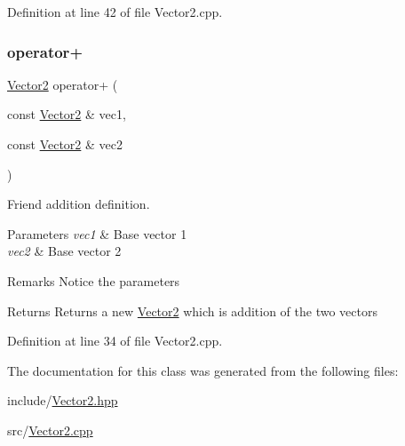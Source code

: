 Definition at line 42 of file Vector2.\+cpp.

\mbox{\label{classVector2_aec551a9b18e5851febf60c555fc382ab}} 
\subsubsection{\texorpdfstring{operator+}{operator+}\hspace{0.1cm}{\footnotesize\ttfamily [2/2]}}
{\footnotesize\ttfamily \mbox{\hyperlink{classVector2}{Vector2}} operator+ (\begin{DoxyParamCaption}\item[{const \mbox{\hyperlink{classVector2}{Vector2}} \&}]{vec1,  }\item[{const \mbox{\hyperlink{classVector2}{Vector2}} \&}]{vec2 }\end{DoxyParamCaption})\hspace{0.3cm}{\ttfamily [friend]}}



Friend addition definition. 


\begin{DoxyParams}{Parameters}
{\em vec1} & Base vector 1 \\
\hline
{\em vec2} & Base vector 2 \\
\hline
\end{DoxyParams}
\begin{DoxyRemark}{Remarks}
Notice the parameters 
\end{DoxyRemark}
\begin{DoxyReturn}{Returns}
Returns a new \mbox{\hyperlink{classVector2}{Vector2}} which is addition of the two vectors 
\end{DoxyReturn}


Definition at line 34 of file Vector2.\+cpp.



The documentation for this class was generated from the following files\+:\begin{DoxyCompactItemize}
\item 
include/\mbox{\hyperlink{Vector2_8hpp}{Vector2.\+hpp}}\item 
src/\mbox{\hyperlink{Vector2_8cpp}{Vector2.\+cpp}}\end{DoxyCompactItemize}
